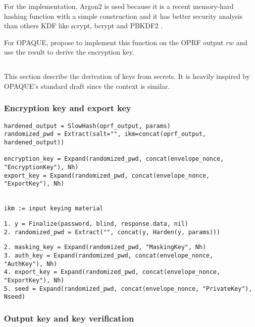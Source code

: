\documentclass[../report.tex]{subfiles}
\begin{document}
For the implementation, Argon2 is used because it is a recent memory-hard hashing function with a simple construction and it has better security analysis than others KDF like scrypt, bcrypt and PBKDF2 \cite{CAA}.

For OPAQUE, \cite{OPAQUE_Standard_Draft} propose to implement this function on the OPRF output $rw$ and use the result to derive the encryption key.


\subsection{}

This section describe the derivation of keys from secrets. It is heavily inspired by OPAQUE's standard draft \cite{OPAQUE_Standard_Draft} since the context is similar.



\subsubsection{Encryption key and export key}


\begin{verbatim}
hardened_output = SlowHash(oprf_output, params)
randomized_pwd = Extract(salt="", ikm=concat(oprf_output, hardened_output))

encryption_key = Expand(randomized_pwd, concat(envelope_nonce, "EncryptionKey"), Nh)
export_key = Expand(randomized_pwd, concat(envelope_nonce, "ExportKey"), Nh)


ikm := input keying material
\end{verbatim}




\begin{verbatim}
1. y = Finalize(password, blind, response.data, nil)
2. randomized_pwd = Extract("", concat(y, Harden(y, params)))
\end{verbatim}


\begin{verbatim}
2. masking_key = Expand(randomized_pwd, "MaskingKey", Nh)
3. auth_key = Expand(randomized_pwd, concat(envelope_nonce, "AuthKey"), Nh)
4. export_key = Expand(randomized_pwd, concat(envelope_nonce, "ExportKey"), Nh)
5. seed = Expand(randomized_pwd, concat(envelope_nonce, "PrivateKey"), Nseed)
\end{verbatim}


\subsubsection{Output key and key verification}
\end{document}
